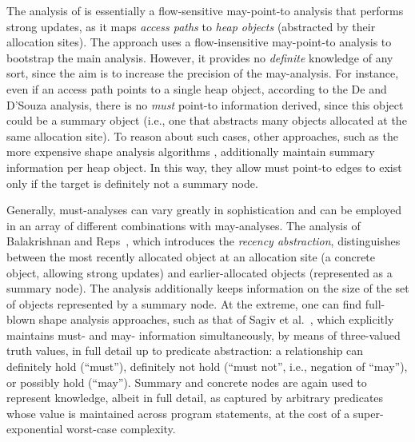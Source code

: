 The analysis of \cite{De:2012:SFP:2367163.2367203} is essentially a
flow-sensitive may-point-to analysis that performs strong updates, as
it maps \emph{access paths} to \emph{heap objects} (abstracted by
their allocation sites). 
The approach uses a flow-insensitive
may-point-to analysis to bootstrap the main analysis. However, it
provides no \emph{definite} knowledge of any sort, since the aim is to
increase the precision of the may-analysis. For instance, even if an
access path points to a single heap object, according to the De and
D'Souza analysis, there is no \emph{must} point-to information
derived, since this object could be a summary object (i.e., one that
abstracts many objects allocated at the same allocation site). To
reason about such cases, other approaches, such as the more expensive
shape analysis algorithms \cite{mattmight:Sagiv:2002:TVLA},
additionally maintain summary information per heap object. In this
way, they allow must point-to edges to exist only if the target is
definitely not a summary node.


Generally, must-analyses can vary greatly in sophistication and can be
employed in an array of different combinations with may-analyses.  The
analysis of Balakrishnan and Reps~\cite{sas/BalakrishnanR06}, which
introduces the \emph{recency abstraction}, distinguishes between the
most recently allocated object at an allocation site (a concrete
object, allowing strong updates) and earlier-allocated objects
(represented as a summary node). The analysis additionally keeps
information on the size of the set of objects represented by a summary
node. At the extreme, one can find full-blown shape analysis
approaches, such as that of Sagiv et
al.~\cite{mattmight:Sagiv:2002:TVLA}, which explicitly maintains must-
and may- information simultaneously, by means of three-valued truth
values, in full detail up to predicate abstraction: a
relationship can definitely hold (``must''), definitely not hold
(``must not'', i.e., negation of ``may''), or possibly hold
(``may''). Summary and concrete nodes are again used to represent
knowledge, albeit in full detail, as captured by arbitrary predicates
whose value is maintained across program statements, at the cost of a
super-exponential worst-case complexity.

